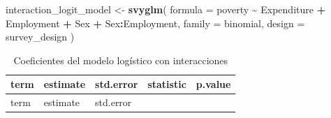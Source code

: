 \documentclass[
  spanish,
  12pt,
]{book}
\newenvironment{Shaded}{\begin{snugshade}}{\end{snugshade}}
\newcommand{\AttributeTok}[1]{\textcolor[rgb]{0.13,0.29,0.53}{#1}}
\newcommand{\FunctionTok}[1]{\textcolor[rgb]{0.13,0.29,0.53}{\textbf{#1}}}
\newcommand{\NormalTok}[1]{#1}
\newcommand{\OtherTok}[1]{\textcolor[rgb]{0.56,0.35,0.01}{#1}}
\newcommand{\SpecialCharTok}[1]{\textcolor[rgb]{0.81,0.36,0.00}{\textbf{#1}}}
\begin{document}
\begin{Shaded}
\begin{Highlighting}[]
\NormalTok{interaction\_logit\_model }\OtherTok{\textless{}{-}} \FunctionTok{svyglm}\NormalTok{(}
  \AttributeTok{formula =}\NormalTok{ poverty }\SpecialCharTok{\textasciitilde{}}\NormalTok{ Expenditure }\SpecialCharTok{+}\NormalTok{ Employment }\SpecialCharTok{+}\NormalTok{ Sex }\SpecialCharTok{+}\NormalTok{ Sex}\SpecialCharTok{:}\NormalTok{Employment,}
  \AttributeTok{family =}\NormalTok{ binomial,}
  \AttributeTok{design =}\NormalTok{ survey\_design}
\NormalTok{)}
\end{Highlighting}
\end{Shaded}

\begin{longtable}[]{@{}
  >{\raggedright\arraybackslash}p{}
  >{\centering\arraybackslash}p{}
  >{\centering\arraybackslash}p{}
  >{\centering\arraybackslash}p{}
  >{\centering\arraybackslash}p{}@{}}
\caption{\label{tab:tab-logistica-interaccion}Coeficientes del modelo logístico con interacciones}\tabularnewline
\toprule\noalign{}
\begin{minipage}[b]{\linewidth}\raggedright
term
\end{minipage} & \begin{minipage}[b]{\linewidth}\centering
estimate
\end{minipage} & \begin{minipage}[b]{\linewidth}\centering
std.error
\end{minipage} & \begin{minipage}[b]{\linewidth}\centering
statistic
\end{minipage} & \begin{minipage}[b]{\linewidth}\centering
p.value
\end{minipage} \\
\midrule\noalign{}
\endfirsthead
\toprule\noalign{}
\begin{minipage}[b]{\linewidth}\raggedright
term
\end{minipage} & \begin{minipage}[b]{\linewidth}\centering
estimate
\end{minipage} & \begin{minipage}[b]{\linewidth}\centering
std.error
\end{minipage} & \begin{minipage}[b]{\linewidth}\centering

\end{minipage}
\end{longtable}
\end{document}
